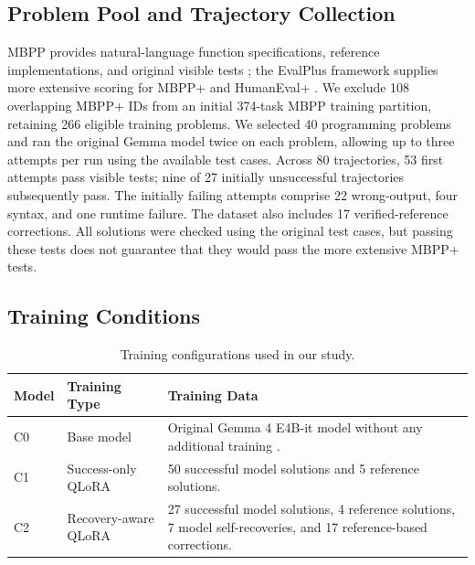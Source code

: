 \documentclass[10pt,twocolumn]{article}
\newcommand{\mbppplus}{MBPP+}
\newcommand{\humanplus}{HumanEval+}
\begin{document}
\subsection{Problem Pool and Trajectory Collection}
MBPP provides natural-language function specifications, reference implementations, and original visible tests \cite{mbpp}; the EvalPlus framework supplies more extensive scoring for \mbppplus{} and \humanplus{} \cite{evalplus}. We exclude 108 overlapping MBPP+ IDs from an initial 374-task MBPP training partition, retaining 266 eligible training problems. We selected 40 programming problems and ran the original Gemma model twice on each problem, allowing up to three attempts per run using the available test cases. Across 80 trajectories, 53 first attempts pass visible tests; nine of 27 initially unsuccessful trajectories subsequently pass. The initially failing attempts comprise 22 wrong-output, four syntax, and one runtime failure. The dataset also includes 17 verified-reference corrections. All solutions were checked using the original test cases, but passing these tests does not guarantee that they would pass the more extensive MBPP+ tests.


\subsection{Training Conditions}


\begin{table}[t]
\centering
\caption{Training configurations used in our study.}
\label{tab:training_conditions}
\small
\setlength{\tabcolsep}{5pt}
\renewcommand{\arraystretch}{1.2}

\begin{tabular}{@{}p{}
                p{}
                p{}@{}}
\toprule
\textbf{Model} & \textbf{Training Type} & \textbf{Training Data} \\
\midrule

C0 & Base model &
Original Gemma 4 E4B-it model without any additional training \cite{gemma4}. \\

C1 & Success-only QLoRA &
50 successful model solutions and 5 reference solutions. \\

C2 & Recovery-aware QLoRA &
27 successful model solutions, 4 reference solutions, 7 model self-recoveries, and 17 reference-based corrections. \\

\bottomrule
\end{tabular}
\end{table}
\end{document}
